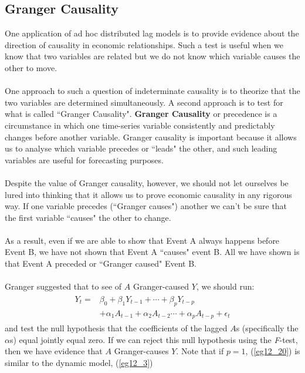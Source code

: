 \documentclass[11pt]{article}
\begin{document}
\subsection{Granger Causality}
One application of ad hoc distributed lag models is to provide evidence about the direction of causality in economic relationships. Such a test is useful when we know that two variables are related but we do not know which variable causes the other to move. \\ \\
One approach to such a question of indeterminate causality is to theorize that the two variables are determined simultaneously. A second approach is to test for what is called ``Granger Causality". 
\textbf{Granger Causality} or precedence is a circumstance in which one time-series variable consistently and predictably changes before another variable. Granger causality is important because it allows us to analyse which variable precedes or ``leads" the other, and such leading variables are useful for forecasting purposes. \\ \\
Despite the value of Granger causality, however, we should not let ourselves be lured into thinking that it allows us to prove economic causality in any rigorous way. If one variable precedes (``Granger causes") another we can't be sure that the first variable ``causes" the other to change.\\ \\
As a result, even if we are able to show that Event A always happens before Event B, we have not shown that Event A ``causes" event B. All we have shown is that Event A preceded or ``Granger caused" Event B.\\ \\
Granger suggested that to see of $A$ Granger-caused $Y$, we should run:
\begin{align}
\label{eg12_20}
\begin{split}
Y_t = &\beta_0 + \beta_1Y_{t-1} + \cdots + \beta_pY_{t-p} \\&+ \alpha_1A_{t-1} + \alpha_2A_{t-2} \cdots + \alpha_pA_{t-p} + \epsilon_t 
\end{split}
\end{align}
and test the null hypothesis that the coefficients of the lagged $A$s (specifically the $\alpha$s) equal jointly equal zero. If we can reject this null hypothesis using the \textit{F}-test, then we have evidence that $A$ Granger-causes $Y$. Note that if $p=1$, (\ref{eg12_20}) is similar to the dynamic model, (\ref{eg12_3})\\ \\
\end{document}
